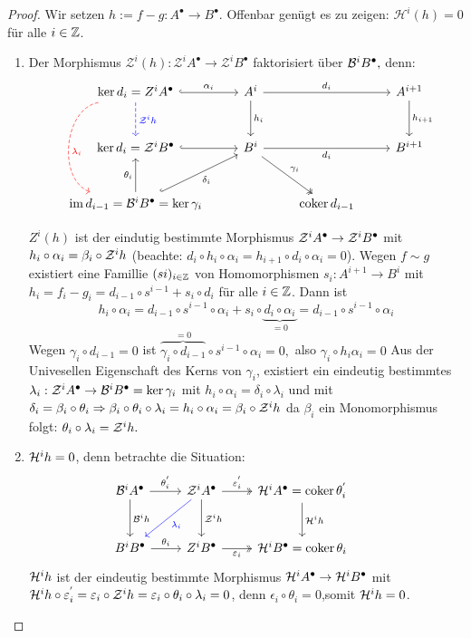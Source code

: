 \begin{proof}
	Wir setzen $h:= f-g: A^{\bullet} \to B^{\bullet} $. Offenbar genügt es zu zeigen: $\mathcal{H}^i(h) = 0 $ für alle $ i \in \mathbb{Z}$. 
	\begin{enumerate}
		\item Der Morphismus $ \mathcal{Z}^i(h): \mathcal{Z}^iA^{\bullet} \to \mathcal{Z}^iB^{\bullet} $ faktorisiert über $\mathcal{B}^iB^{\bullet},$ denn: \\
		$$\begin{tikzcd}[row sep = large]
		\ker d_i = Z^iA^{\bullet} \arrow[dashed, blue]{d}{\ZZ^ih} \arrow[hook]{r}{\alpha_i} \arrow[dashed,red, bend right = 75]{dd}{\lambda_i}& A^i \arrow{d}{h_i}\arrow{rr}{d_i} & & A^{i+1} \arrow{d}{h_{i+1}} \\
		\ker d_i =\ZZ^iB^{\bullet} \arrow[hook]{r} & B^i \arrow[swap]{rr}{d_i}\arrow[two heads]{dr}{\gamma_i} & & B^{i+1}  \\
		\im d_{i-1} = \BB^iB^{\bullet} = \ker \gamma_i \arrow{u}{\theta_i} \arrow[swap, hook]{ur}{\delta_i} &  &\coker d_{i-1} &
		\end{tikzcd}$$
		
		$Z^i(h) $ ist der eindutig bestimmte Morphismus $ \mathcal{Z}^iA^{\bullet} \to \mathcal{Z}^iB^{\bullet} $ mit $h_i \circ \alpha_i = \beta_i \circ \mathcal{Z}^ih $ (beachte: $d_i \circ h_i \circ \alpha_i = h_{i+1} \circ d_i \circ \alpha_i = 0$). Wegen $ f \sim g $ existiert eine Famillie $(si)_{i \in \mathbb{Z}} $ von Homomorphismen $s_i: A^{i+1} \to B^i $ mit $ h_i=f_i -g_i = d_{i -1} \circ s^{i-1} + s_i \circ d_i $ für alle $i \in \mathbb{Z}$. Dann ist
		$$h_i \circ \alpha_i = d_{i-1} \circ s^{i-1} \circ \alpha_i + s_i \circ \underbrace{d_i \circ \alpha_i}_{=0} = d_{i-1} \circ s^{i-1} \circ \alpha_i$$ Wegen $ \gamma_i \circ d_{i-1}= 0 $ ist $ \overbrace{\gamma_i \circ d_{i-1}}^{=0} \circ s^{i-1} \circ \alpha_i = 0, $ also $ \gamma_i \circ h_i \alpha_i = 0$ Aus der Univesellen Eigenschaft des Kerns von $\gamma_i $, existiert ein eindeutig bestimmtes $ \lambda_i : \mathcal{Z}^iA^{\bullet} \to \mathcal{B}^iB^{\bullet} = \ker \gamma_i $ mit $ h_i \circ \alpha_i = \delta_i \circ \lambda_i $ und mit $\delta_i = \beta_i \circ \theta_i \Rightarrow \beta_i \circ \theta_i \circ \lambda_i = h_i \circ \alpha_i = \beta_i \circ \mathcal{Z}^ih $ da $\beta_i$ ein Monomorphismus folgt: $ \theta_i \circ \lambda_i = \mathcal{Z}^ih.$
		\item $\mathcal{H}^ih = 0$, denn betrachte die Situation:
		$$\begin{tikzcd}[row sep = large]
		\BB^iA^{\bullet} \arrow{d}{\BB^ih} \arrow{r}{\theta_i^{'}} & \ZZ^iA^{\bullet} \arrow{d}{\ZZ^ih} \arrow[blue]{dl}{\lambda_i} \arrow[two heads]{r}{\epsilon_i^{'}} & \HH^iA^{\bullet} = \coker \theta_i^{'} \arrow{d}{\HH^ih} & \\
		B^iB^{\bullet} \arrow{r}{\theta_i} & Z^iB^{\bullet} \arrow[swap, two heads]{r}{\epsilon_i} & \HH^iB^{\bullet} = \coker \theta_i& 
		\end{tikzcd}$$
		$\mathcal{H}^ih$ ist der eindeutig bestimmte Morphismus $\mathcal{H}^iA^{\bullet} \to \mathcal{H}^iB^{\bullet} $ mit $\mathcal{H}^ih \circ \varepsilon_i^{'} = \varepsilon_i \circ \mathcal{Z}^ih = \varepsilon_i \circ \theta_i \circ \lambda_i = 0$, denn $\epsilon_i \circ \theta_i =0 $,somit $\mathcal{H}^ih=0 $.
	\end{enumerate}
\end{proof}
